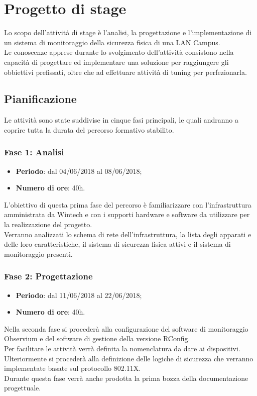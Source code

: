 \documentclass[Tesi.tex]{subfiles}
\begin{document}
\chapter{Progetto di stage}
Lo scopo dell'attività di stage è l’analisi, la progettazione e l'implementazione di un sistema di monitoraggio della sicurezza fisica di una LAN Campus. \\
Le conoscenze apprese durante lo svolgimento dell'attività consistono nella capacità di progettare ed implementare una soluzione per raggiungere gli obbiettivi prefissati, oltre che ad effettuare attività di tuning per perfezionarla.


\section{Pianificazione}
Le attività sono state suddivise in cinque fasi principali, le quali andranno a coprire tutta la durata del percorso formativo stabilito.

\subsection{Fase 1: Analisi}
\begin{itemize}
	\item \textbf{Periodo}: dal 04/06/2018 al 08/06/2018;
	\item \textbf{Numero di ore}: 40h.
\end{itemize}

L'obiettivo di questa prima fase del percorso è familiarizzare con l'infrastruttura amministrata da Wintech e con i supporti hardware e software da utilizzare per la realizzazione del progetto. \\
Verranno analizzati lo schema di rete dell'infrastruttura, la lista degli apparati e delle loro caratteristiche, il sistema di sicurezza fisica attivi e il sistema di monitoraggio presenti. 

\subsection{Fase 2: Progettazione}
\begin{itemize}
	\item \textbf{Periodo}: dal 11/06/2018 al 22/06/2018;
	\item \textbf{Numero di ore}: 40h.
\end{itemize}
	
Nella seconda fase si procederà alla configurazione del software di monitoraggio Observium e del software di gestione della versione RConfig. \\
Per facilitare le attività verrà definita la nomenclatura da dare ai dispositivi.\\
Ulteriormente si procederà alla definizione delle logiche di sicurezza che verranno implementate basate sul protocollo 802.11X. \\
Durante questa fase verrà anche prodotta la prima bozza della documentazione progettuale.
	
\end{document}
